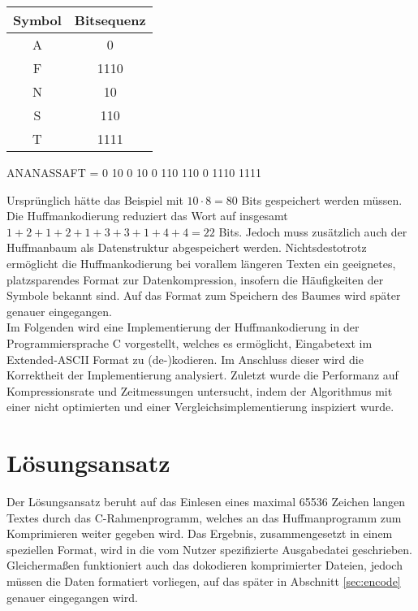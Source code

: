\documentclass[course=erap]{aspdoc}
\begin{document}
\begin{center}
    \begin{tabular}{c|c}
        \textbf{Symbol} & \textbf{Bitsequenz} \\
        \hline
        A & 0 \\
        F & 1110 \\
        N & 10 \\
        S & 110 \\
        T & 1111
    \end{tabular}
    \label{tab:my_label}
\end{center}
\begin{center}
    ANANASSAFT = 0 10 0 10 0 110 110 0 1110 1111
\end{center}
Ursprünglich hätte das Beispiel mit $10\cdot8 = 80$ Bits gespeichert werden müssen. Die Huffmankodierung reduziert das Wort auf insgesamt $1+2+1+2+1+3+3+1+4+4=22$ Bits. Jedoch muss zusätzlich auch der Huffmanbaum als Datenstruktur abgespeichert werden. Nichtsdestotrotz ermöglicht die Huffmankodierung bei vorallem längeren Texten ein geeignetes, platzsparendes Format zur Datenkompression, insofern die Häufigkeiten der Symbole bekannt sind. Auf das Format zum Speichern des Baumes wird später genauer eingegangen.\cite{4051119}\\
Im Folgenden wird eine Implementierung der Huffmankodierung in der Programmiersprache C vorgestellt, welches es ermöglicht, Eingabetext im Extended-ASCII Format
zu (de-)kodieren. Im Anschluss dieser wird die Korrektheit der Implementierung analysiert. Zuletzt wurde die Performanz auf Kompressionsrate und Zeitmessungen untersucht, indem der Algorithmus mit einer nicht optimierten und einer Vergleichsimplementierung inspiziert wurde.

\section{Lösungsansatz}

Der Lösungsansatz beruht auf das Einlesen eines maximal 65536 Zeichen langen Textes durch das C-Rahmenprogramm, welches an das Huffmanprogramm zum Komprimieren weiter gegeben wird. Das Ergebnis, zusammengesetzt in einem speziellen Format, wird in die vom Nutzer spezifizierte Ausgabedatei geschrieben. Gleichermaßen funktioniert auch das dokodieren komprimierter Dateien, jedoch müssen die Daten formatiert vorliegen, auf das später in Abschnitt \ref{sec:encode} genauer eingegangen wird.
\end{document}

